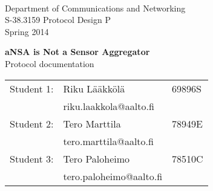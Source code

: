 \begin{titlepage}

\begin{flushleft}
 \\
Department of Communications and Networking \\
S-38.3159 Protocol Design P \\
Spring 2014
\end{flushleft}

\vspace{8cm}
\begin{center}
  {\LARGE \textbf{aNSA is Not a Sensor Aggregator}}\\
  {\LARGE Protocol documentation}
\end{center}

\vfill

\begin{center}
\begin{tabular}{rll}
	Student 1:	& Riku Lääkkölä 	& 69896S \\
				& riku.laakkola@aalto.fi & \\    
    Student 2: 	& Tero Marttila		& 78949E \\
    			& tero.marttila@aalto.fi & \\
    Student 3:	& Tero Paloheimo	& 78510C \\
    			& tero.paloheimo@aalto.fi & \\
\end{tabular}
\end{center}

\end{titlepage}